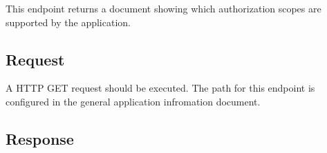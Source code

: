 This endpoint returns a document showing which authorization scopes are supported
by the application.

\subsection{Request}
\label{subsec:request-supported-scopes}

A HTTP GET request should be executed.
The path for this endpoint is configured in the general application infromation document.

\subsection{Response}
\label{subsec:response-supported-scopes}


